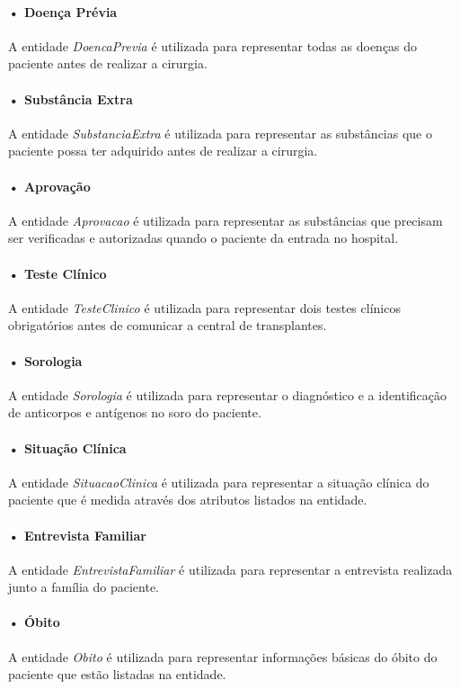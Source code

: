 \documentclass[portuguese,oneside]{tcc}
\begin{document}
\paragraph*{• Doença Prévia}
A entidade \textit{DoencaPrevia} é utilizada para representar todas as doenças do paciente antes de realizar a cirurgia.

\paragraph*{• Substância Extra}
A entidade \textit{SubstanciaExtra} é utilizada para representar as substâncias que o paciente possa ter adquirido antes de realizar a cirurgia.

\paragraph*{• Aprovação}
A entidade \textit{Aprovacao} é utilizada para representar as substâncias que precisam ser verificadas e autorizadas quando o paciente da entrada no hospital. 

\paragraph*{• Teste Clínico}
A entidade \textit{TesteClinico} é utilizada para representar dois testes clínicos obrigatórios antes de comunicar a central de transplantes.

\paragraph*{• Sorologia}
A entidade \textit{Sorologia} é utilizada para representar o diagnóstico e a identificação de anticorpos e antígenos no soro do paciente.

\paragraph*{• Situação Clínica}
A entidade \textit{SituacaoClinica} é utilizada para representar a situação clínica do paciente que é medida através dos atributos listados na entidade.

\paragraph*{• Entrevista Familiar}
A entidade \textit{EntrevistaFamiliar} é utilizada para representar a entrevista realizada junto a família do paciente.

\paragraph*{• Óbito}
A entidade \textit{Obito} é utilizada para representar informações básicas do óbito do paciente que estão listadas na entidade.
\end{document}
